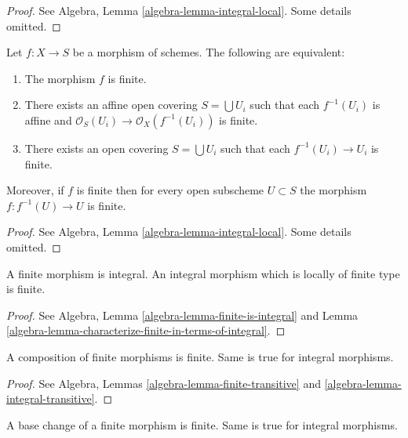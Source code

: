 \begin{proof}
See Algebra, Lemma \ref{algebra-lemma-integral-local}.
Some details omitted.
\end{proof}

\begin{lemma}
\label{lemma-finite-local}
Let $f : X \to S$ be a morphism of schemes.
The following are equivalent:
\begin{enumerate}
\item The morphism $f$ is finite.
\item There exists an affine open covering $S = \bigcup U_i$ such that
each $f^{-1}(U_i)$ is affine and
$\mathcal{O}_S(U_i) \to \mathcal{O}_X(f^{-1}(U_i))$ is finite.
\item There exists an open covering $S = \bigcup U_i$
such that each $f^{-1}(U_i) \to U_i$ is finite.
\end{enumerate}
Moreover, if $f$ is finite then for every open subscheme
$U \subset S$ the morphism $f : f^{-1}(U) \to U$ is finite.
\end{lemma}

\begin{proof}
See Algebra, Lemma \ref{algebra-lemma-integral-local}.
Some details omitted.
\end{proof}

\begin{lemma}
\label{lemma-finite-integral}
A finite morphism is integral.
An integral morphism which is locally of finite type is finite.
\end{lemma}

\begin{proof}
See Algebra, Lemma \ref{algebra-lemma-finite-is-integral}
and Lemma \ref{algebra-lemma-characterize-finite-in-terms-of-integral}.
\end{proof}

\begin{lemma}
\label{lemma-composition-finite}
A composition of finite morphisms is finite.
Same is true for integral morphisms.
\end{lemma}

\begin{proof}
See Algebra, Lemmas \ref{algebra-lemma-finite-transitive}
and \ref{algebra-lemma-integral-transitive}.
\end{proof}

\begin{lemma}
\label{lemma-base-change-finite}
A base change of a finite morphism is finite.
Same is true for integral morphisms.
\end{lemma}

